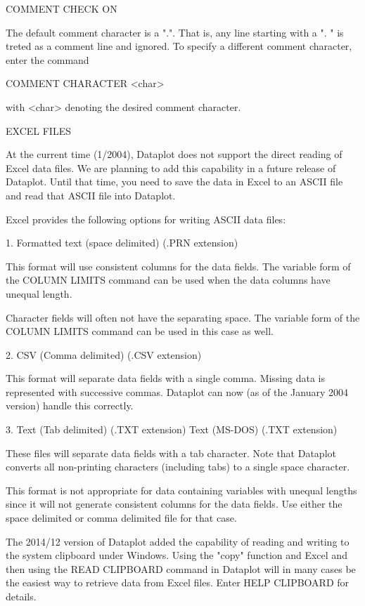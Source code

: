     COMMENT CHECK ON

The default comment character is a ".".  That is, any line starting
with a ". " is treted as a comment line and ignored.  To specify
a different comment character, enter the command

    COMMENT CHARACTER  <char>

with <char> denoting the desired comment character.


EXCEL FILES

At the current time (1/2004), Dataplot does not support the
direct reading of Excel data files.  We are planning to add
this capability in a future release of Dataplot.  Until that
time, you need to save the data in Excel to an ASCII file and
read that ASCII file into Dataplot.
 
Excel provides the following options for writing ASCII data
files:

  1. Formatted text (space delimited) (.PRN extension)

     This format will use consistent columns for the data fields.
     The variable form of the COLUMN LIMITS command can be used
     when the data columns have unequal length.

     Character fields will often not have the separating space.  The
     variable form of the COLUMN LIMITS command can be used in this
     case as well.

  2. CSV (Comma delimited) (.CSV extension)

     This format will separate data fields with a single comma.
     Missing data is represented with successive commas.  Dataplot
     can now (as of the January 2004 version) handle this correctly.

  3. Text (Tab delimited) (.TXT extension)
     Text (MS-DOS) (.TXT extension)

     These files will separate data fields with a tab character.
     Note that Dataplot converts all non-printing characters
     (including tabs) to a single space character.

     This format is not appropriate for data containing variables
     with unequal lengths since it will not generate consistent
     columns for the data fields.  Use either the space delimited
     or comma delimited file for that case.

The 2014/12 version of Dataplot added the capability of reading
and writing to the system clipboard under Windows.  Using the
"copy" function and Excel and then using the READ CLIPBOARD command
in Dataplot will in many cases be the easiest way to retrieve
data from Excel files.  Enter HELP CLIPBOARD for details.


